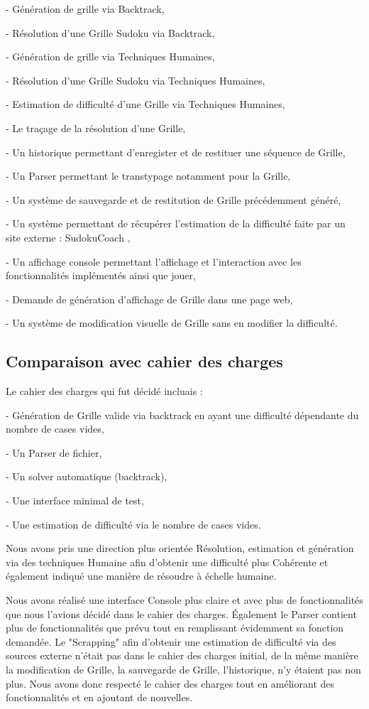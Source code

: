 \documentclass[a4paper]{article}
\begin{document}
- Génération de grille via Backtrack,

- Résolution d'une Grille Sudoku via Backtrack,

- Génération de grille via Techniques Humaines,

- Résolution d'une Grille Sudoku via Techniques Humaines,

- Estimation de difficulté d'une Grille via Techniques Humaines,

- Le traçage de la résolution d'une Grille,

- Un historique permettant d'enregister et de restituer une séquence de Grille,

- Un Parser permettant le transtypage notamment pour la Grille,

- Un système de sauvegarde et de restitution de Grille précédemment généré,

- Un système permettant de récupérer l'estimation de la difficulté faite par un site externe : SudokuCoach \textbf{\cite{sudokucoach}},

- Un affichage console permettant l'affichage et l'interaction avec les fonctionnalités implémentés ainsi que jouer,

- Demande de génération d'affichage de Grille dans une page web,
   
- Un système de modification visuelle de Grille sans en modifier la difficulté.

\subsection{Comparaison avec cahier des charges}
Le cahier des charges qui fut décidé incluais :
    
- Génération de Grille valide via backtrack en ayant une difficulté dépendante du nombre de cases vides,

- Un Parser de fichier,

- Un solver automatique (backtrack),

- Une interface minimal de test,

- Une estimation de difficulté via le nombre de cases vides.

Nous avons pris une direction plus orientée Résolution, estimation et génération via des techniques Humaine afin d'obtenir une difficulté plus Cohérente et également indiqué une manière de résoudre à échelle humaine.

Nous avons réalisé une interface Console plus claire et avec plus de fonctionnalités que nous l'avions décidé dans le cahier des charges. Également le Parser contient plus de fonctionnalités que prévu tout en remplissant évidemment sa fonction demandée. Le "Scrapping" afin d'obtenir une estimation de difficulté via des sources externe n'était pas dans le cahier des charges initial, de la même manière la modification de Grille, la sauvegarde de Grille, l'historique, n'y étaient pas non plus. 
Nous avons donc respecté le cahier des charges tout en améliorant des fonctionnalités et en ajoutant de nouvelles.
\end{document}
